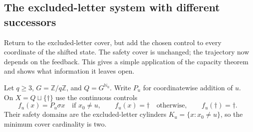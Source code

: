 \documentclass[11pt,reqno]{amsart}
\numberwithin{equation}{section}
\theoremstyle{definition}
\theoremstyle{definition}
\newcommand{\Nzero}{\mathbb N_0}
\begin{document}
\subsection{The excluded-letter system with different successors}
Return to the excluded-letter cover, but add the chosen control to
every coordinate of the shifted state. The safety cover is unchanged;
the trajectory now depends on the feedback. This gives a simple
application of the capacity theorem and shows what information it
leaves open.

Let $q\ge3$, $G=\mathbb Z/q\mathbb Z$, and $Q=G^{\Nzero}$.
Write $P_u$ for coordinatewise addition of $u$. On
$X=Q\sqcup\{\dagger\}$ use the continuous controls
\[
 f_u(x)=P_u\sigma x\quad\text{if }x_0\ne u,
 \qquad f_u(x)=\dagger\quad\text{otherwise},
 \qquad f_u(\dagger)=\dagger.
\]
Their safety domains are the excluded-letter cylinders
$K_u=\{x:x_0\ne u\}$, so the minimum cover cardinality is two.
\end{document}

